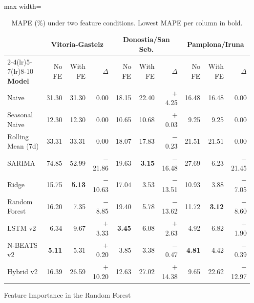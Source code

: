 ﻿\documentclass[12pt,reqno, twoside]{amsbook}
\makeatletter
\numberwithin{figure}{chapter}
\numberwithin{table}{chapter}
\numberwithin{equation}{chapter}
\def\subsection{\@startsection{subsection}{2}%
      \z@{.5\linespacing\@plus.7\linespacing}{.25\linespacing}%
      {\normalfont\bfseries\flushleft}}
\theoremstyle{plain}
\numberwithin{equation}{chapter}
\numberwithin{section}{chapter}
\makeatother
\begin{document}
\begin{table}[htbp]
\centering
\caption{\ac{MAPE} (\%) under two feature conditions. Lowest \ac{MAPE} per column in bold.}
\label{tab:feature_ablation}
\begin{adjustbox}{max width=\textwidth}
\begin{tabular}{lrrrrrrrrr}
\toprule
& \multicolumn{3}{c}{\textbf{Vitoria-Gasteiz}} & \multicolumn{3}{c}{\textbf{Donostia/San Seb.}} & \multicolumn{3}{c}{\textbf{Pamplona/Iruna}} \\
\cmidrule(lr){2-4}\cmidrule(lr){5-7}\cmidrule(lr){8-10}
\textbf{Model} & No FE & With FE & $\Delta$ & No FE & With FE & $\Delta$ & No FE & With FE & $\Delta$ \\
\midrule
Naive               & 31.30 & 31.30 &   0.00 & 18.15 & 22.40 & $+$4.25  & 16.48 & 16.48 &   0.00 \\
Seasonal Naive      & 12.30 & 12.30 &   0.00 & 10.65 & 10.68 & $+$0.03  &  9.25 &  9.25 &   0.00 \\
Rolling Mean (7d)   & 33.31 & 33.31 &   0.00 & 18.07 & 17.83 & $-$0.23  & 21.51 & 21.51 &   0.00 \\
SARIMA              & 74.85 & 52.99 & $-$21.86 & 19.63 &  \textbf{3.15} & $-$16.48 & 27.69 &  6.23 & $-$21.45 \\
Ridge               & 15.75 &  \textbf{5.13} & $-$10.63 & 17.04 &  3.53 & $-$13.51 & 10.93 &  3.88 &  $-$7.05 \\
Random Forest       & 16.20 &  7.35 & $-$8.85 & 19.40 &  5.78 & $-$13.62 & 11.72 &  \textbf{3.12} &  $-$8.60 \\
LSTM v2             &  6.34 &  9.67 & $+$3.33 &  \textbf{3.45} &  6.08 & $+$2.63  &  4.92 &  6.82 & $+$1.90 \\
N-BEATS v2          & \textbf{5.11} & 5.31 & $+$0.20 & 3.85 & 3.38 & $-$0.47 & \textbf{4.81} & 4.42 & $-$0.39 \\
Hybrid v2           & 16.39 & 26.59 & $+$10.20 & 12.63 & 27.02 & $+$14.38 &  9.65 & 22.62 & $+$12.97 \\
\bottomrule
\end{tabular}
\end{adjustbox}
\end{table}

\FloatBarrier

\subsection{Feature Importance in the Random Forest}
\label{subsec:rf_importance}
\end{document}
